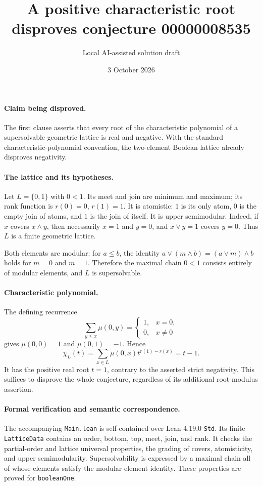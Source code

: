 \documentclass[10pt]{article}
\title{A positive characteristic root disproves conjecture 00000008535}
\author{Local AI-assisted solution draft}
\date{3 October 2026}
\makeatletter
\renewcommand{\maketitle}{\begin{center}
{\Large\bfseries\@title\par}\vspace{0.6em}
{\small\@author\par\@date}
\end{center}\vspace{0.5em}}
\makeatother
\begin{document}
\maketitle
\paragraph{Claim being disproved.}
The first clause asserts that every root of the characteristic polynomial of a supersolvable geometric lattice is real and negative. With the standard characteristic-polynomial convention, the two-element Boolean lattice already disproves negativity.
\paragraph{The lattice and its hypotheses.}
Let $L=\{0,1\}$ with $0<1$. Its meet and join are minimum and maximum; its rank function is $r(0)=0$, $r(1)=1$. It is atomistic: $1$ is its only atom, $0$ is the empty join of atoms, and $1$ is the join of itself. It is upper semimodular. Indeed, if $x$ covers $x\wedge y$, then necessarily $x=1$ and $y=0$, and $x\vee y=1$ covers $y=0$. Thus $L$ is a finite geometric lattice.

Both elements are modular: for $a\le b$, the identity $a\vee(m\wedge b)=(a\vee m)\wedge b$ holds for $m=0$ and $m=1$. Therefore the maximal chain $0<1$ consists entirely of modular elements, and $L$ is supersolvable.
\paragraph{Characteristic polynomial.}
The defining recurrence
\[
 \sum_{y\le x}\mu(0,y)=\begin{cases}1,&x=0,\\0,&x\ne0\end{cases}
\]
gives $\mu(0,0)=1$ and $\mu(0,1)=-1$. Hence
\[
 \chi_L(t)=\sum_{x\in L}\mu(0,x)t^{r(1)-r(x)}=t-1.
\]
It has the positive real root $t=1$, contrary to the asserted strict negativity. This suffices to disprove the whole conjecture, regardless of its additional root-modulus assertion.
\paragraph{Formal verification and semantic correspondence.}
The accompanying \texttt{Main.lean} is self-contained over Lean 4.19.0 \texttt{Std}. Its finite \texttt{LatticeData} contains an order, bottom, top, meet, join, and rank. It checks the partial-order and lattice universal properties, the grading of covers, atomisticity, and upper semimodularity. Supersolvability is expressed by a maximal chain all of whose elements satisfy the modular-element identity. These properties are proved for \texttt{booleanOne}.
\end{document}
